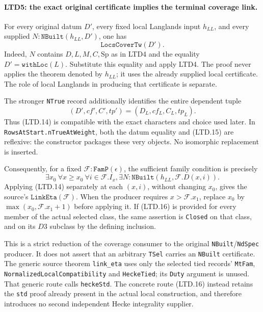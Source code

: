 \paragraph{LTD5: the exact original certificate implies the terminal coverage link.}
\label{claim:LTD5}
For every original datum \(D'\), every fixed local Langlands
input \(h_{LL}\), and every supplied
\(N:\texttt{NBuilt}(h_{LL},D')\), one has
\[
                    \texttt{LocsCoverTw}(D').                    \tag{LTD.14}
\]
Indeed, \(N\) contains \(D,L,M,C,\mathrm{Sp}\) as in LTD4 and
the equality \(D'=\texttt{withLoc}(L)\).  Substitute this
equality and apply LTD4.  The proof never applies the theorem
denoted by \(h_{LL}\); it uses the already supplied local
certificate.  The role of local Langlands in producing that
certificate is separate.

The stronger \texttt{NTrue} record additionally identifies the
entire dependent tuple
\[
 (D',cf',C',tp')
       =(D_L,cf_L,C_L,tp_L).                                     \tag{LTD.15}
\]
Thus (LTD.14) is compatible with the exact characters and choice
used later.  In \texttt{RowsAtStart.}\allowbreak\texttt{nTrueAtWeight}, both the datum
equality and (LTD.15) are reflexive: the constructor packages
these very objects.  No isomorphic replacement is inserted.

Consequently, for a fixed \(\mathcal F:\texttt{FamP}(\epsilon)\),
the sufficient family condition is precisely
\[
 \exists x_0\ \forall x\ge x_0\ \forall i\in\mathcal F.I_x,
       \exists N:\texttt{NBuilt}(h_{LL},\mathcal F.D(x,i)).
 \tag{LTD.16}
\]
Applying (LTD.14) separately at each \((x,i)\), without changing
\(x_0\), gives the source's \(\texttt{LinkEta}(\mathcal F)\).
When the producer requires \(x>\mathcal F.x_1\), replace
\(x_0\) by \(\max(x_0,\mathcal F.x_1+1)\) before applying it.
If (LTD.16) is provided for every member of the actual selected
class, the same assertion is \texttt{Closed} on that class,
and on its \(D3\) subclass by the defining inclusion.

This is a strict reduction of the coverage consumer to the
original \texttt{NBuilt}/\texttt{NdSpec} producer.  It does not
assert that an arbitrary \texttt{TSel} carries an \texttt{NBuilt}
certificate.  The generic source theorem \texttt{link\_eta}
uses only the selected tied records' \texttt{MtFam},
\texttt{NormalizedLocalCompatibility} and \texttt{HeckeTied};
its \texttt{Duty} argument is unused.  That generic route calls
\texttt{heckeStd}.  The concrete route (LTD.16) instead retains
the \texttt{std} proof already present in the actual local
construction, and therefore introduces no second independent
Hecke integrality supplier.

